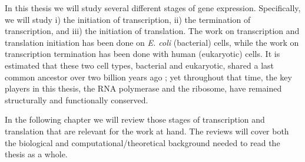 In this thesis we will study several different stages of gene expression.
Specifically, we will study i) the initiation of transcription, ii) the
termination of transcription, and iii) the initiation of translation. The work
on transcription and translation initiation has been done on \textit{E. coli}
(bacterial) cells, while the work on transcription termination has been done
with human (eukaryotic) cells. It is estimated that these two cell types,
bacterial and eukaryotic, shared a last common ancestor over two billion years
ago \cite{vellai_origin_1999}; yet throughout that time, the key players in
this thesis, the RNA polymerase and the ribosome, have remained structurally
and functionally conserved.

In the following chapter we will review those stages of transcription and
translation that are relevant for the work at hand. The reviews will cover both
the biological and computational/theoretical background needed to read the
thesis as a whole.

